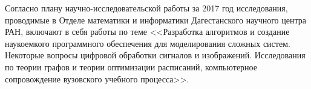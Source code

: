 \Introduction

Согласно плану научно-исследовательской работы за 2017 год исследования, проводимые в Отделе математики и информатики Дагестанского научного центра РАН, включают в себя работы по теме
<<Разработка алгоритмов и создание наукоемкого программного обеспечения для моделирования сложных систем. Некоторые вопросы цифровой обработки сигналов и изображений. Исследования по теории графов и теории оптимизации расписаний, компьютерное сопровождение вузовского учебного процесса>>.






